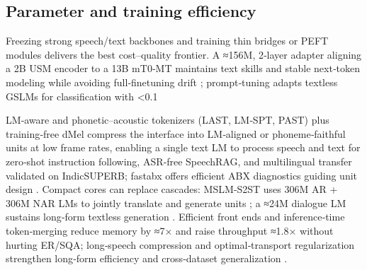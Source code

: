 \subsection{Parameter and training efficiency} \label{subsec:Parameter and training efficiency}
Freezing strong speech/text backbones and training thin bridges or PEFT modules delivers the best cost–quality frontier. A ≈156M, 2‑layer adapter aligning a 2B USM encoder to a 13B mT0‑MT maintains text skills and stable next‑token modeling while avoiding full‑finetuning drift \cite{wang2023slmbridgethingapbetweenspeechtextfoundat}; prompt‑tuning adapts textless GSLMs for classification with <0.1%

LM‑aware and phonetic–acoustic tokenizers (LAST, LM‑SPT, PAST) plus training‑free dMel compress the interface into LM‑aligned or phoneme‑faithful units at low frame rates, enabling a single text LM to process speech and text for zero‑shot instruction following, ASR‑free SpeechRAG, and multilingual transfer validated on IndicSUPERB; fastabx offers efficient ABX diagnostics guiding unit design \cite{turetzky2024lastlanguagemodelawarespeechtokenization,jo2025lmsptalignedsemanticdistillationspeechto,har-tuv2025pastphoneticacousticspeechtokenizer,bai2025dmelspeechtokenizationmadesimple,min2025speechretrievalaugmentedgenerationwithou,poli2025fastabxlibraryefficientcomputationabxdis,entry2025indicsuperbspeechprocessinguniversalperf,vashishth2024stabspeechtokenizerassessmentbenchmark}. Compact cores can replace cascades: MSLM‑S2ST uses 306M AR + 306M NAR LMs to jointly translate and generate units \cite{peng2024mslms2stmultitaskspeechlanguagemodeltext}; a ≈24M dialogue LM sustains long‑form textless generation \cite{nakata2024jchatjapaneselargescalespokendialoguecor}. Efficient front ends and inference‑time token‑merging reduce memory by ≈7× and raise throughput ≈1.8× without hurting ER/SQA; long‑speech compression and optimal‑transport regularization strengthen long‑form efficiency and cross‑dataset generalization \cite{lu2024fastadaspmultitaskadaptedefficientinfere,guo2025fastlongspeechenhancinglargespeechlangua,xu2025optimaltransportregularizationspeechtext}.

